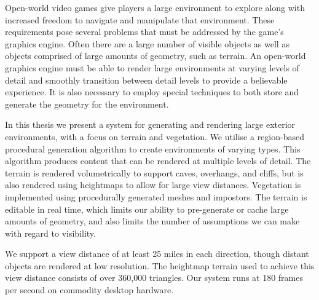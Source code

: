 Open-world video games give players a large environment to explore along with increased freedom to navigate and manipulate that environment.
These requirements pose several problems that must be addressed by the game's graphics engine.
Often there are a large number of visible objects as well as objects comprised of large amounts of geometry, such as terrain.
An open-world graphics engine must be able to render large environments at varying levels of detail and smoothly transition between detail levels to provide a believable experience.
It is also necessary to employ special techniques to both store and generate the geometry for the environment.

In this thesis we present a system for generating and rendering large exterior environments, with a focus on terrain and vegetation.
We utilise a region-based procedural generation algorithm to create environments of varying types.
This algorithm produces content that can be rendered at multiple levels of detail.
The terrain is rendered volumetrically to support caves, overhangs, and cliffs, but is also rendered using heightmaps to allow for large view distances.
Vegetation is implemented using procedurally generated meshes and impostors.
The terrain is editable in real time, which limits our ability to pre-generate or cache large amounts of geometry, and also limits the number of assumptions we can make with regard to visibility.

We support a view distance of at least 25 miles in each direction, though distant objects are rendered at low resolution.
The heightmap terrain used to achieve this view distance consists of over 360,000 triangles.
Our system runs at 180 frames per second on commodity desktop hardware.
